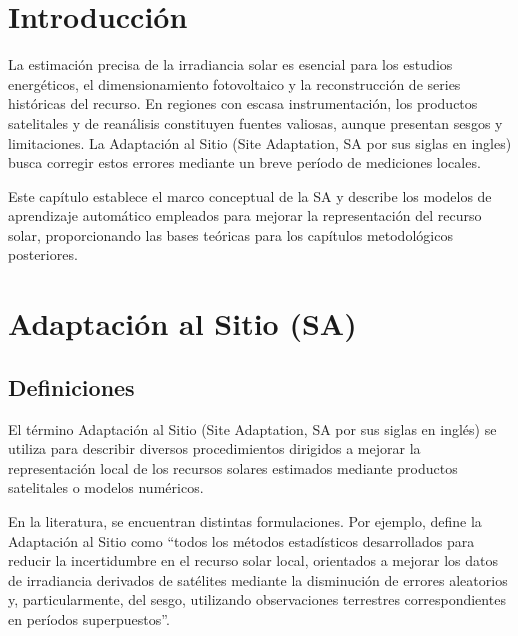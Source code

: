 \documentclass[letterpaper,12pt, twoside]{report}
\providecommand{\DIFdeltex}[1]{{\protect\color{red} \scriptsize #1}} %
\providecommand{\DIFdel}[1]{\texorpdfstring{\DIFdeltex{#1}}{}} %
\begin{document}
\section{\DIFdel{Introducción}}
\addtocounter{section}{-1}%

\DIFdel{La estimación precisa de la irradiancia solar es esencial para los estudios energéticos, el dimensionamiento fotovoltaico y la reconstrucción de series históricas del recurso. En regiones con escasa instrumentación, los productos satelitales y de reanálisis constituyen fuentes valiosas, aunque presentan sesgos y limitaciones. La Adaptación al Sitio (Site Adaptation, SA por sus siglas en ingles) busca corregir estos errores mediante un breve período de mediciones locales.
}%

\DIFdel{Este capítulo establece el marco conceptual de la SA y describe los modelos de aprendizaje automático empleados para mejorar la representación del recurso solar, proporcionando las bases teóricas para los capítulos metodológicos posteriores.
}%

\section{\DIFdel{Adaptación al Sitio (SA)}}
\addtocounter{section}{-1}%

\subsection{\DIFdel{Definiciones}}
\addtocounter{subsection}{-1}%
\DIFdel{El término Adaptación al Sitio (Site Adaptation, SA por sus siglas en inglés) se utiliza para describir diversos procedimientos dirigidos a mejorar la representación local de los recursos solares estimados mediante productos satelitales o modelos numéricos.
}%

\DIFdel{En la literatura, se encuentran distintas formulaciones. Por ejemplo, \citet{POLO2016} define la Adaptación al Sitio como “todos los métodos estadísticos desarrollados para reducir la incertidumbre en el recurso solar local, orientados a mejorar los datos de irradiancia derivados de satélites mediante la disminución de errores aleatorios y, particularmente, del sesgo, utilizando observaciones terrestres correspondientes en períodos superpuestos”.
}%
\end{document}
